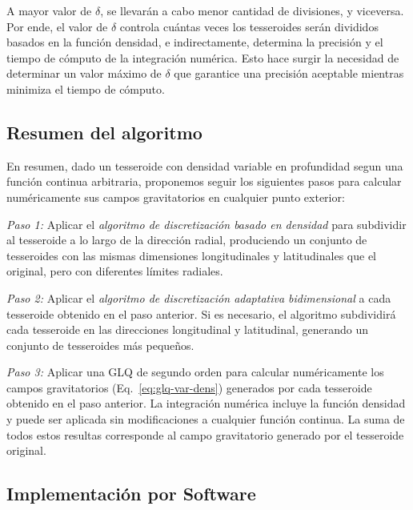 A mayor valor de $\delta$, se llevarán a cabo menor cantidad de divisiones,
y viceversa.
Por ende, el valor de $\delta$ controla cuántas veces los tesseroides serán
divididos basados en la función densidad, e indirectamente, determina la
precisión y el tiempo de cómputo de la integración numérica.
Esto hace surgir la necesidad de determinar un valor máximo de $\delta$ que
garantice una precisión aceptable mientras minimiza el tiempo de cómputo.


\subsection{Resumen del algoritmo}

En resumen, dado un tesseroide con densidad variable en profundidad segun una
función continua arbitraria, proponemos seguir los siguientes pasos para
calcular numéricamente sus campos gravitatorios en cualquier punto exterior:

\textit{Paso 1:}
Aplicar el \emph{algoritmo de discretización basado en densidad} para
subdividir al tesseroide a lo largo de la dirección radial, produciendo un
conjunto de tesseroides con las mismas dimensiones longitudinales
y latitudinales que el original, pero con diferentes límites radiales.

\textit{Paso 2:}
Aplicar el \emph{algoritmo de discretización adaptativa bidimensional} a cada
tesseroide obtenido en el paso anterior.
Si es necesario, el algoritmo subdividirá cada tesseroide en las direcciones
longitudinal y latitudinal, generando un conjunto de tesseroides más pequeños.

\textit{Paso 3:}
Aplicar una \ac{GLQ} de segundo orden para calcular numéricamente los campos
gravitatorios (Eq.~\ref{eq:glq-var-dens}) generados por cada tesseroide
obtenido en el paso anterior. La integración numérica incluye la función
densidad y puede ser aplicada sin modificaciones a cualquier función continua.
La suma de todos estos resultas corresponde al campo gravitatorio generado por
el tesseroide original.


\subsection{Implementación por Software}

